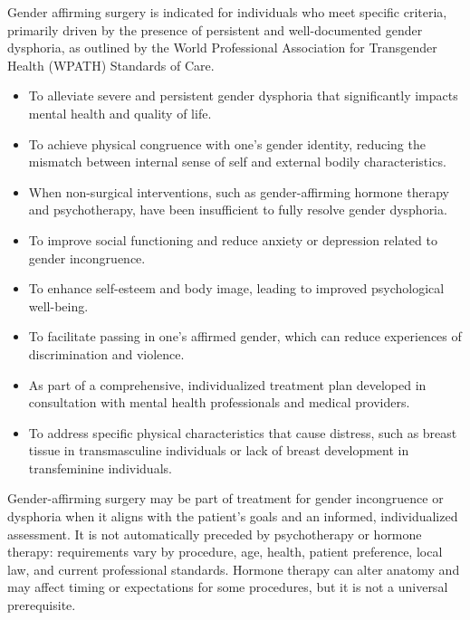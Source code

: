 Gender affirming surgery is indicated for individuals who meet specific criteria, primarily driven by the presence of persistent and well-documented gender dysphoria, as outlined by the World Professional Association for Transgender Health (WPATH) Standards of Care.

\begin{itemize}
  \item To alleviate severe and persistent gender dysphoria that significantly impacts mental health and quality of life.
  \item To achieve physical congruence with one's gender identity, reducing the mismatch between internal sense of self and external bodily characteristics.
  \item When non-surgical interventions, such as gender-affirming hormone therapy and psychotherapy, have been insufficient to fully resolve gender dysphoria.
  \item To improve social functioning and reduce anxiety or depression related to gender incongruence.
  \item To enhance self-esteem and body image, leading to improved psychological well-being.
  \item To facilitate passing in one's affirmed gender, which can reduce experiences of discrimination and violence.
  \item As part of a comprehensive, individualized treatment plan developed in consultation with mental health professionals and medical providers.
  \item To address specific physical characteristics that cause distress, such as breast tissue in transmasculine individuals or lack of breast development in transfeminine individuals.
\end{itemize}

Gender-affirming surgery may be part of treatment for gender incongruence or dysphoria when it aligns with the patient's goals and an informed, individualized assessment. It is not automatically preceded by psychotherapy or hormone therapy: requirements vary by procedure, age, health, patient preference, local law, and current professional standards. Hormone therapy can alter anatomy and may affect timing or expectations for some procedures, but it is not a universal prerequisite.

